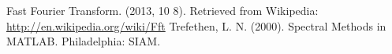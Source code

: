 
\begin{thebibliography}{9}
Fast Fourier Transform. (2013, 10 8). Retrieved from Wikipedia: \url{http://en.wikipedia.org/wiki/Fft}
Trefethen, L. N. (2000). Spectral Methods in MATLAB. Philadelphia: SIAM.
\end{thebibliography}
